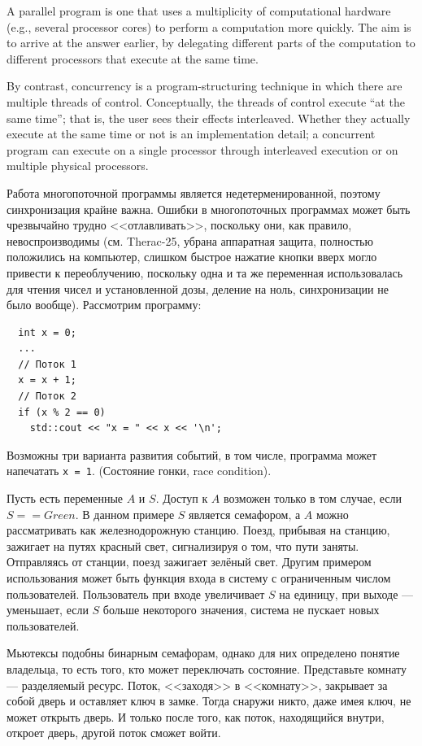 \documentclass{book}
\begin{document}
A parallel program is one that uses a multiplicity of computational hardware (e.g., several
processor cores) to perform a computation more quickly. The aim is to arrive at the answer earlier,
by delegating different parts of the computation to different processors that execute at the same
time.

By contrast, concurrency is a program-structuring technique in which there are multiple threads of
control. Conceptually, the threads of control execute “at the same time”; that is, the user sees
their effects interleaved. Whether they actually execute at the same time or not is an
implementation detail; a concurrent program can execute on a single processor through interleaved
execution or on multiple physical processors.

Работа многопоточной программы является недетерменированной, поэтому
синхронизация крайне важна. Ошибки в многопоточных программах может быть
чрезвычайно трудно <<отлавливать>>, поскольку они, как правило,
невоспроизводимы (см. Therac-25, убрана аппаратная защита, полностью положились на компьютер,
слишком быстрое нажатие кнопки вверх могло привести к переоблучению, поскольку одна и та же
переменная использовалась для чтения чисел и установленной дозы, деление на ноль, синхронизации не
было вообще). Рассмотрим программу:
\begin{verbatim}
  int x = 0;
  ...
  // Поток 1
  x = x + 1;
  // Поток 2
  if (x % 2 == 0)
    std::cout << "x = " << x << '\n';
\end{verbatim}
Возможны три варианта развития событий, в том числе, программа может напечатать 
\texttt{x = 1}. (Состояние гонки, race condition).

Пусть есть переменные $A$ и $S$. Доступ к $A$ возможен только в том случае, если $S
== Green$. В данном примере $S$ является семафором, а $A$ можно рассматривать
как железнодорожную станцию. Поезд, прибывая на станцию, зажигает на путях
красный свет, сигнализируя о том, что пути заняты. Отправляясь от станции, поезд
зажигает зелёный свет. Другим примером использования может быть функция входа в
систему с ограниченным числом пользователей. Пользователь при входе увеличивает
$S$ на единицу, при выходе --- уменьшает, если $S$ больше некоторого значения,
система не пускает новых пользователей.

Мьютексы подобны бинарным семафорам, однако для них определено понятие
владельца, то есть того, кто может переключать состояние. Представьте комнату
--- разделяемый ресурс. Поток, <<заходя>> в <<комнату>>, закрывает за собой
дверь и оставляет ключ в замке. Тогда снаружи никто, даже имея ключ, не может
открыть дверь. И только после того, как поток, находящийся внутри, откроет дверь,
другой поток сможет войти.
\end{document}

